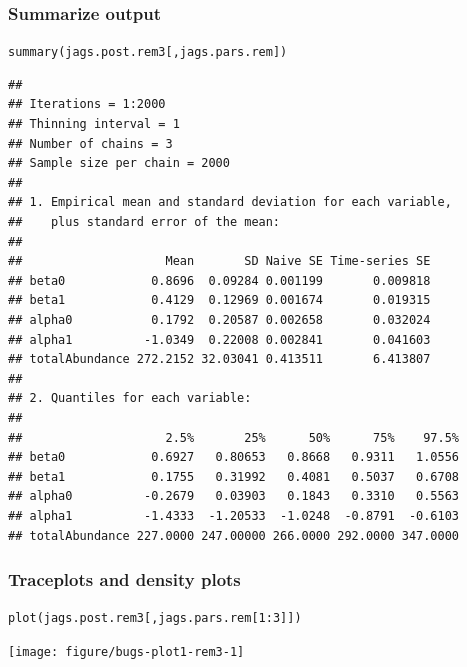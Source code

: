 \documentclass[color=usenames,dvipsnames]{beamer}\usepackage[]{graphicx}\usepackage[]{color}
\makeatletter
\newcommand{\hlnum}[1]{\textcolor[rgb]{0.69,0.494,0}{#1}}%
\newcommand{\hlopt}[1]{\textcolor[rgb]{0,0,0}{#1}}%
\newcommand{\hlstd}[1]{\textcolor[rgb]{0,0,0}{#1}}%
\newcommand{\hlkwd}[1]{\textcolor[rgb]{0.004,0.004,0.506}{#1}}%
\newenvironment{kframe}{%
 \def\at@end@of@kframe{}%
 \ifinner\ifhmode%
  \def\at@end@of@kframe{\end{minipage}}%
  \begin{minipage}{\columnwidth}%
 \fi\fi%
 \def\FrameCommand##1{\hskip\@totalleftmargin \hskip-\fboxsep
 \colorbox{shadecolor}{##1}\hskip-\fboxsep
     \hskip-\linewidth \hskip-\@totalleftmargin \hskip\columnwidth}%
 \MakeFramed {\advance\hsize-\width
   \@totalleftmargin\z@ \linewidth\hsize
   \@setminipage}}%
 {\par\unskip\endMakeFramed%
 \at@end@of@kframe}
\newenvironment{knitrout}{}{} %
\makeatother
\begin{document}
\begin{frame}[fragile]
  \frametitle{Summarize output}
\begin{knitrout}\tiny
{}\color{fgcolor}\begin{kframe}
\begin{alltt}
\hlkwd{summary}\hlstd{(jags.post.rem3[,jags.pars.rem])}
\end{alltt}
\begin{verbatim}
## 
## Iterations = 1:2000
## Thinning interval = 1 
## Number of chains = 3 
## Sample size per chain = 2000 
## 
## 1. Empirical mean and standard deviation for each variable,
##    plus standard error of the mean:
## 
##                    Mean       SD Naive SE Time-series SE
## beta0            0.8696  0.09284 0.001199       0.009818
## beta1            0.4129  0.12969 0.001674       0.019315
## alpha0           0.1792  0.20587 0.002658       0.032024
## alpha1          -1.0349  0.22008 0.002841       0.041603
## totalAbundance 272.2152 32.03041 0.413511       6.413807
## 
## 2. Quantiles for each variable:
## 
##                    2.5%       25%      50%      75%    97.5%
## beta0            0.6927   0.80653   0.8668   0.9311   1.0556
## beta1            0.1755   0.31992   0.4081   0.5037   0.6708
## alpha0          -0.2679   0.03903   0.1843   0.3310   0.5563
## alpha1          -1.4333  -1.20533  -1.0248  -0.8791  -0.6103
## totalAbundance 227.0000 247.00000 266.0000 292.0000 347.0000
\end{verbatim}
\end{kframe}
\end{knitrout}
\end{frame}




\begin{frame}[fragile]
  \frametitle{Traceplots and density plots}
\begin{knitrout}\footnotesize
{}\color{fgcolor}\begin{kframe}
\begin{alltt}
\hlkwd{plot}\hlstd{(jags.post.rem3[,jags.pars.rem[}\hlnum{1}\hlopt{:}\hlnum{3}\hlstd{]])}
\end{alltt}
\end{kframe}

{\centering \texttt{[image: figure/bugs-plot1-rem3-1]} 

}



\end{knitrout}
\end{frame}
\end{document}
